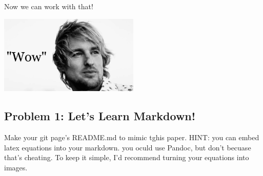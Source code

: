 \documentclass{article}
\begin{document}
Now we can work with that!
\begin{center}
	\includegraphics[width = 0.5\textwidth]{wow.jpg}
\end{center}
\subsection*{Problem 1: Let's Learn Markdown!}
Make your git page's README.md to mimic tghis paper. HINT: you can embed latex equations into your markdown. you oculd use Pandoc, but don't becuase that's cheating. To keep it simple, I'd recommend turning your equations into images.
\end{document}
